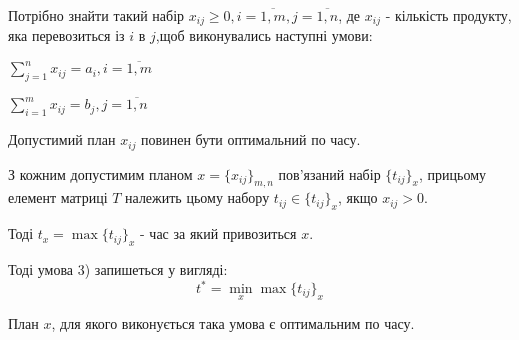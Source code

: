 \documentclass[12pt,a4paper]{book}
\newenvironment{slim_enumerate}{
\begin{enumerate}
  \setlength{\itemsep}{1pt}
  \setlength{\parskip}{0pt}
  \setlength{\parsep}{0pt}}
{\end{enumerate}}
\begin{document}
Потрібно знайти такий набір $x_{ij} \ge 0, i = \overline{1,m}, j = \overline{1,n}$, де $x_{ij}$ - кількість продукту, яка перевозиться із $i$ в $j$,щоб виконувались наступні умови:
\begin{slim_enumerate}
  \item $ \sum_{j=1}^n x_{ij} = a_i, i = \overline{1,m} $
  \item $ \sum_{i=1}^m x_{ij} = b_j, j = \overline{1,n} $
  \item Допустимий план $x_{ij}$ повинен бути оптимальний по часу.
\end{slim_enumerate}

З кожним допустимим планом $x=\{x_{ij}\}_{m,n}$ пов’язаний набір $\{t_{ij}\}_x$, прицьому елемент матриці $T$ належить цьому набору $t_{ij} \in \{t_{ij}\}_x$, якщо $x_{ij}>0$.

Тоді $t_x = \max \{t_{ij}\}_x$ - час за який привозиться $x$.

Тоді умова 3) запишеться у вигляді:
\[ t^*=\displaystyle\min_x \max \{t_{ij}\}_x \]

План $x$, для якого виконується така умова є оптимальним по часу.
\end{document}
